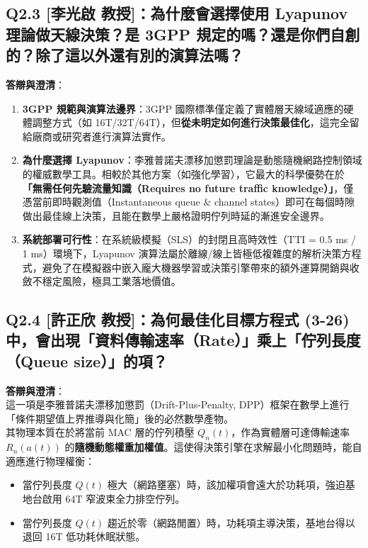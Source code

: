 \subsection*{Q2.3 [李光啟 教授]：為什麼會選擇使用 Lyapunov 理論做天線決策？是 3GPP 規定的嗎？還是你們自創的？除了這以外還有別的演算法嗎？}
\textbf{答辯與澄清}：\\
\begin{enumerate}
    \item \textbf{3GPP 規範與演算法邊界}：3GPP 國際標準僅定義了實體層天線域適應的硬體調整方式（如 16T/32T/64T），但\textbf{從未明定如何進行決策最佳化}，這完全留給廠商或研究者進行演算法實作。
    \item \textbf{為什麼選擇 Lyapunov}：李雅普諾夫漂移加懲罰理論是動態隨機網路控制領域的權威數學工具。相較於其他方案（如強化學習），它最大的科學優勢在於\textbf{「無需任何先驗流量知識（Requires no future traffic knowledge）」}，僅憑當前即時觀測值（Instantaneous queue \& channel states）即可在每個時隙做出最佳線上決策，且能在數學上嚴格證明佇列時延的漸進安全邊界。
    \item \textbf{系統部署可行性}：在系統級模擬（SLS）的封閉且高時效性（TTI = 0.5 ms / 1 ms）環境下，Lyapunov 演算法屬於離線/線上皆極低複雜度的解析決策方程式，避免了在模擬器中嵌入龐大機器學習或決策引擎帶來的額外運算開銷與收斂不穩定風險，極具工業落地價值。
\end{enumerate}

\subsection*{Q2.4 [許正欣 教授]：為何最佳化目標方程式 (3-26) 中，會出現「資料傳輸速率（Rate）」乘上「佇列長度（Queue size）」的項？}
\textbf{答辯與澄清}：\\
這一項是李雅普諾夫漂移加懲罰（Drift-Plus-Penalty, DPP）框架在數學上進行「條件期望值上界推導與化簡」後的必然數學產物。\\
其物理本質在於將當前 MAC 層的佇列積壓 $Q_n(t)$，作為實體層可達傳輸速率 $R_n(a(t))$ 的\textbf{隨機動態權重加權值}。這使得決策引擎在求解最小化問題時，能自適應進行物理權衡：
\begin{itemize}
    \item 當佇列長度 $Q(t)$ 極大（網路壅塞）時，該加權項會遠大於功耗項，強迫基地台啟用 64T 窄波束全力排空佇列。
    \item 當佇列長度 $Q(t)$ 趨近於零（網路閒置）時，功耗項主導決策，基地台得以退回 16T 低功耗休眠狀態。
\end{itemize}

